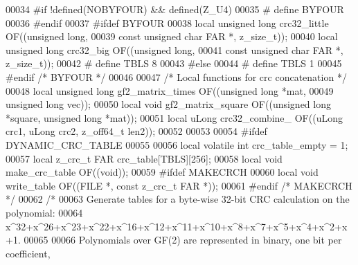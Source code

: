 \begin{DoxyCode}
00034 \textcolor{preprocessor}{#if !defined(NOBYFOUR) && defined(Z\_U4)}
00035 \textcolor{preprocessor}{#  define BYFOUR}
00036 \textcolor{preprocessor}{#endif}
00037 \textcolor{preprocessor}{#ifdef BYFOUR}
00038    local \textcolor{keywordtype}{unsigned} \textcolor{keywordtype}{long} crc32\_little OF((\textcolor{keywordtype}{unsigned} \textcolor{keywordtype}{long},
00039                         \textcolor{keyword}{const} \textcolor{keywordtype}{unsigned} \textcolor{keywordtype}{char} FAR *, z\_size\_t));
00040    local \textcolor{keywordtype}{unsigned} \textcolor{keywordtype}{long} crc32\_big OF((\textcolor{keywordtype}{unsigned} \textcolor{keywordtype}{long},
00041                         \textcolor{keyword}{const} \textcolor{keywordtype}{unsigned} \textcolor{keywordtype}{char} FAR *, z\_size\_t));
00042 \textcolor{preprocessor}{#  define TBLS 8}
00043 \textcolor{preprocessor}{#else}
00044 \textcolor{preprocessor}{#  define TBLS 1}
00045 \textcolor{preprocessor}{#endif }\textcolor{comment}{/* BYFOUR */}\textcolor{preprocessor}{}
00046 
00047 \textcolor{comment}{/* Local functions for crc concatenation */}
00048 local \textcolor{keywordtype}{unsigned} \textcolor{keywordtype}{long} gf2\_matrix\_times OF((\textcolor{keywordtype}{unsigned} \textcolor{keywordtype}{long} *mat,
00049                                          \textcolor{keywordtype}{unsigned} \textcolor{keywordtype}{long} vec));
00050 local \textcolor{keywordtype}{void} gf2\_matrix\_square OF((\textcolor{keywordtype}{unsigned} \textcolor{keywordtype}{long} *square, \textcolor{keywordtype}{unsigned} \textcolor{keywordtype}{long} *mat));
00051 local uLong crc32\_combine\_ OF((uLong crc1, uLong crc2, z\_off64\_t len2));
00052 
00053 
00054 \textcolor{preprocessor}{#ifdef DYNAMIC\_CRC\_TABLE}
00055 
00056 local \textcolor{keyword}{volatile} \textcolor{keywordtype}{int} crc\_table\_empty = 1;
00057 local z\_crc\_t FAR crc\_table[TBLS][256];
00058 local \textcolor{keywordtype}{void} make\_crc\_table OF((\textcolor{keywordtype}{void}));
00059 \textcolor{preprocessor}{#ifdef MAKECRCH}
00060    local \textcolor{keywordtype}{void} write\_table OF((FILE *, \textcolor{keyword}{const} z\_crc\_t FAR *));
00061 \textcolor{preprocessor}{#endif }\textcolor{comment}{/* MAKECRCH */}\textcolor{preprocessor}{}
00062 \textcolor{comment}{/*}
00063 \textcolor{comment}{  Generate tables for a byte-wise 32-bit CRC calculation on the polynomial:}
00064 \textcolor{comment}{  x^32+x^26+x^23+x^22+x^16+x^12+x^11+x^10+x^8+x^7+x^5+x^4+x^2+x+1.}
00065 \textcolor{comment}{}
00066 \textcolor{comment}{  Polynomials over GF(2) are represented in binary, one bit per coefficient,}

\end{DoxyCode}
